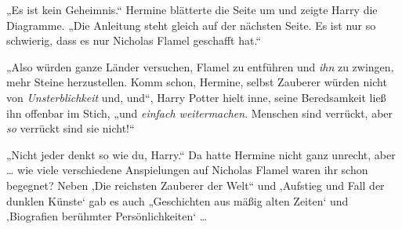 „Es ist kein Geheimnis.“ Hermine blätterte die Seite um und zeigte Harry die Diagramme.
„Die Anleitung steht gleich auf der nächsten Seite. Es ist nur so schwierig, dass es nur Nicholas Flamel geschafft hat.“

„Also würden ganze Länder versuchen, Flamel zu entführen und \emph{ihn} zu zwingen, mehr Steine herzustellen. Komm schon, Hermine, selbst Zauberer würden nicht von \emph{Unsterblichkeit} und, und“, Harry Potter hielt inne, seine Beredsamkeit ließ ihn offenbar im Stich, „und \emph{einfach weitermachen}. Menschen sind verrückt, aber \emph{so} verrückt sind sie nicht!“

„Nicht jeder denkt so wie du, Harry.“ Da hatte Hermine nicht ganz unrecht, aber … wie viele verschiedene Anspielungen auf Nicholas Flamel waren ihr schon begegnet? Neben ‚Die reichsten Zauberer der Welt“ und ‚Aufstieg und Fall der dunklen Künste‘ gab es auch
„Geschichten aus mäßig alten Zeiten‘ und ‚Biografien berühmter Persönlichkeiten‘ …

